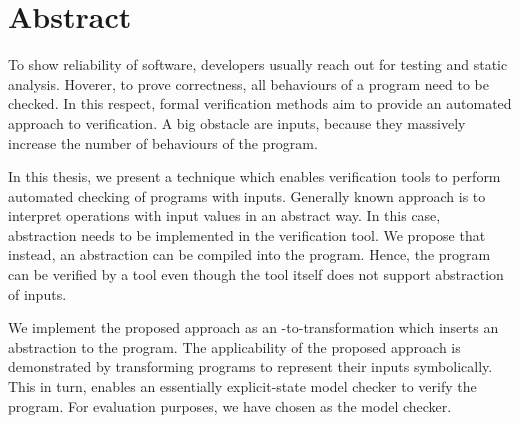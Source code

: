 \chapter*{Abstract}

To show reliability of software, developers usually reach out for testing
and static analysis. Hoverer, to prove correctness, all behaviours of a
program need to be checked. In this respect, formal verification methods aim to
provide an automated approach to verification. A big obstacle are inputs,
because they massively increase the number of behaviours of the program.

In this thesis, we present a technique which enables verification tools to
perform automated checking of programs with inputs. Generally known approach
is to interpret operations with input values in an abstract way. In this case,
abstraction needs to be implemented in the verification tool. We propose that
instead, an abstraction can be compiled into the program. Hence, the program
can be verified by a tool even though the tool itself does not support
abstraction of inputs.

We implement the proposed approach as an \LLVM-to-\LLVM transformation which
inserts an abstraction to the program. The applicability of the proposed
approach is demonstrated by transforming programs to represent their inputs
symbolically. This in turn, enables an essentially explicit-state model checker
to verify the program. For evaluation purposes, we have chosen \DIVINE as the model checker.
